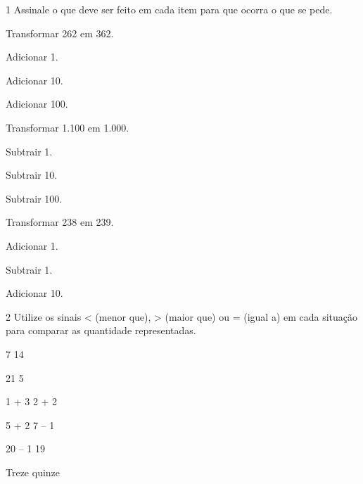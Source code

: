 
\num{1} Assinale o que deve ser feito em cada item para que ocorra o que se pede.

\begin{escolha}

\item
  Transformar 262 em 362.

\begin{boxlist}
 Adicionar 1.

 Adicionar 10.

 Adicionar 100.
\end{boxlist}

\item
  Transformar 1.100 em 1.000.

\begin{boxlist}
 Subtrair 1.

 Subtrair 10.

 Subtrair 100.
\end{boxlist}

\item
  Transformar 238 em 239.

\begin{boxlist}
 Adicionar 1.

 Subtrair 1.

 Adicionar 10.
\end{boxlist}

\end{escolha}

\num{2} Utilize os sinais \textless{} (menor que), \textgreater{} (maior que) ou
= (igual a) em cada situação para comparar as quantidade representadas.\bigskip

\begin{minipage}{.5\textwidth}
\begin{escolha}
\item
  7  14
\item
  21  5
\item
  1 + 3  2 + 2
  \end{escolha}
  \end{minipage}
\begin{minipage}{.5\textwidth}
  \begin{escolha}[start=4]
\item
  5 + 2  7 -- 1
\item
  20 -- 1  19
\item
  Treze  quinze
\end{escolha}
\end{minipage}

